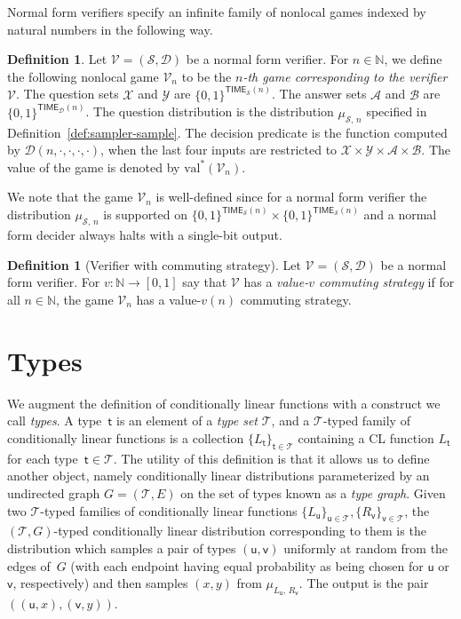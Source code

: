 \documentclass[11pt]{article}
\theoremstyle{definition}
\newtheorem{definition}[theorem]{Definition}
\newcommand{\N}{\ensuremath{\mathbb{N}}}
\newcommand{\val}{\ensuremath{\mathrm{val}}}
\newcommand{\sampler}{\mathcal{S}}
\newcommand{\decider}{\mathcal{D}}
\newcommand{\verifier}{\mathcal{V}}
\newcommand{\type}{\mathcal{T}}
\newcommand{\tvarstyle}[1]{\mathsf{#1}}
\newcommand{\tvar}{\ensuremath{\tvarstyle{t}}}
\newcommand{\lvar}{\ensuremath{\tvarstyle{u}}}
\newcommand{\rvar}{\ensuremath{\tvarstyle{v}}}
\renewcommand{\cal}[1]{\mathcal{#1}}
\newcommand{\TIME}{\mathsf{TIME}}
\begin{document}
Normal form verifiers specify an infinite family of nonlocal games indexed by
natural numbers in the following way.

\begin{definition}
  \label{def:normal-game}
  Let $\verifier = (\sampler, \decider)$ be a normal form verifier.
  For $n \in \N$, we define the following nonlocal game $\verifier_{n}$ to be
  the \emph{$n$-th game corresponding to the verifier $\verifier$}.
  The question sets $\cal{X}$ and $\cal{Y}$ are $\{0,1\}^{\TIME_\sampler(n)}$.
  The answer sets $\cal{A}$ and $\cal{B}$ are $\{0,1\}^{\TIME_\decider(n)}$.
  The question distribution is the distribution $\mu_{\sampler,\, n}$ specified
  in Definition~\ref{def:sampler-sample}.
  The decision predicate is the function computed by
  $\decider(n,\cdot,\cdot,\cdot,\cdot)$, when the last four inputs are
  restricted to $\cal{X}\times \cal{Y}\times\cal{A}\times\cal{B}$.
  The value of the game is denoted by $\val^*(\verifier_{n})$.
\end{definition}

We note that the game $\verifier_n$ is well-defined since for a normal form
verifier the distribution $\mu_{\sampler,\, n}$ is supported on
$\{0,1\}^{\TIME_\sampler(n)}\times \{0,1\}^{\TIME_\sampler(n)}$ and a normal
form decider always halts with a single-bit output.

\begin{definition}[Verifier with commuting strategy]
  \label{def:comm-with-checker}
  Let $\verifier = (\sampler, \decider)$ be a normal form verifier.
  For $v:\N\to [0,1]$ say that $\verifier$ has a \emph{value-$v$ commuting
    strategy} if for all $n \in \N$, the game $\verifier_n$ has a value-$v(n)$
  commuting strategy.
\end{definition}


 
\section{Types}
\label{sec:types}

We augment the definition of conditionally linear functions with a construct
we call \emph{types}.
A type~$\tvar$ is an element of a \emph{type set} $\type$, and a $\type$-typed
family of conditionally linear functions is a collection
$\{L_\tvar\}_{\tvar\in\type}$ containing a CL function $L_\tvar$ for each
type~$\tvar\in\type$.
The utility of this definition is that it allows us to define another object,
namely conditionally linear distributions parameterized by an undirected graph
$G = (\type, E)$ on the set of types known as a \emph{type graph}.
Given two $\type$-typed families of conditionally linear functions
$\{L_\lvar\}_{\lvar\in\type}, \{R_\rvar\}_{\rvar\in\type}$, the $(\type,
G)$-typed conditionally linear distribution corresponding to them is the
distribution which samples a pair of types $(\lvar, \rvar)$ uniformly at random
from the edges of~$G$ (with each endpoint having equal probability as being
chosen for $\lvar$ or $\rvar$, respectively) and then samples $(x, y)$ from
$\mu_{L_\lvar,\, R_\rvar}$.
The output is the pair $( (\lvar, x), (\rvar, y) )$.
\end{document}
